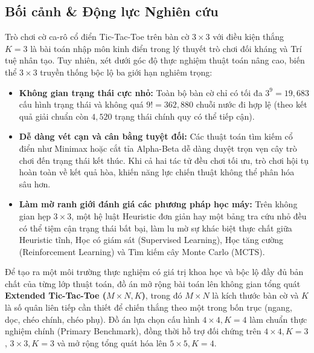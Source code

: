 \documentclass[a4paper,12pt]{report}
\begin{document}
\subsection{Bối cảnh \& Động lực Nghiên cứu}
Trò chơi cờ ca-rô cổ điển Tic-Tac-Toe trên bàn cờ $3 \times 3$ với điều kiện thắng $K=3$ là bài toán nhập môn kinh điển trong lý thuyết trò chơi đối kháng và Trí tuệ nhân tạo. Tuy nhiên, xét dưới góc độ thực nghiệm thuật toán nâng cao, biến thể $3 \times 3$ truyền thống bộc lộ ba giới hạn nghiêm trọng:
\begin{itemize}[leftmargin=1.2cm]
    \item \textbf{Không gian trạng thái cực nhỏ:} Toàn bộ bàn cờ chỉ có tối đa $3^9 = 19{,}683$ cấu hình trạng thái và không quá $9! = 362{,}880$ chuỗi nước đi hợp lệ (theo kết quả giải chuẩn còn $4{,}520$ trạng thái chính quy có thể tiếp cận).
    \item \textbf{Dễ dàng vét cạn và cân bằng tuyệt đối:} Các thuật toán tìm kiếm cổ điển như Minimax hoặc cắt tỉa Alpha-Beta dễ dàng duyệt trọn vẹn cây trò chơi đến trạng thái kết thúc. Khi cả hai tác tử đều chơi tối ưu, trò chơi hội tụ hoàn toàn về kết quả hòa, khiến năng lực chiến thuật không thể phân hóa sâu hơn.
    \item \textbf{Làm mờ ranh giới đánh giá các phương pháp học máy:} Trên không gian hẹp $3 \times 3$, một hệ luật Heuristic đơn giản hay một bảng tra cứu nhỏ đều có thể tiệm cận trạng thái bất bại, làm lu mờ sự khác biệt thực chất giữa Heuristic tĩnh, Học có giám sát (Supervised Learning), Học tăng cường (Reinforcement Learning) và Tìm kiếm cây Monte Carlo (MCTS).
\end{itemize}

Để tạo ra một môi trường thực nghiệm có giá trị khoa học và bộc lộ đầy đủ bản chất của từng lớp thuật toán, đồ án mở rộng bài toán lên không gian tổng quát \textbf{Extended Tic-Tac-Toe ($M \times N, K$)}, trong đó $M \times N$ là kích thước bàn cờ và $K$ là số quân liên tiếp cần thiết để chiến thắng theo một trong bốn trục (ngang, dọc, chéo chính, chéo phụ). Đồ án lựa chọn cấu hình \textbf{$4 \times 4, K=4$} làm chuẩn thực nghiệm chính (Primary Benchmark), đồng thời hỗ trợ đối chứng trên $4 \times 4, K=3$, $3 \times 3, K=3$ và mở rộng tổng quát hóa lên $5 \times 5, K=4$.
\end{document}
